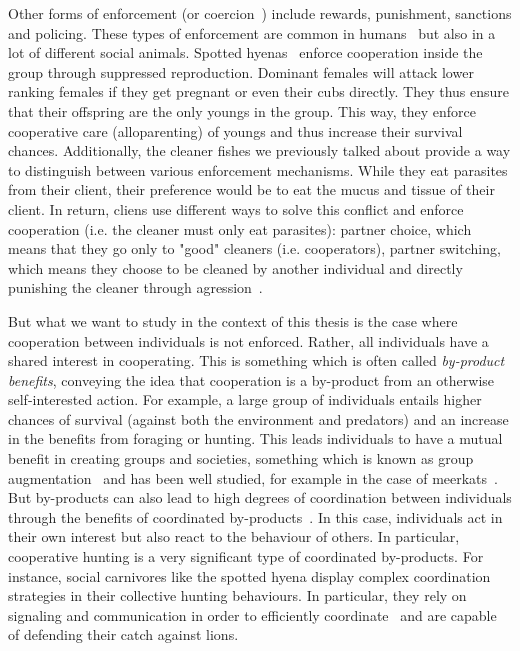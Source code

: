     Other forms of enforcement (or coercion~\parencite{Clutton-Brock2002}) include rewards, punishment, sanctions and policing. These types of enforcement are common in humans~\parencite{Fehr2002} but also in a lot of different social animals. Spotted hyenas~\parencite{Drea2003, Drea2009a, Smith2012a} enforce cooperation inside the group through suppressed reproduction. Dominant females will attack lower ranking females if they get pregnant or even their cubs directly. They thus ensure that their offspring are the only youngs in the group. This way, they enforce cooperative care (alloparenting) of youngs and thus increase their survival chances. Additionally, the cleaner fishes we previously talked about provide a way to distinguish between various enforcement mechanisms. While they eat parasites from their client, their preference would be to eat the mucus and tissue of their client. In return, cliens use different ways to solve this conflict and enforce cooperation (i.e. the cleaner must only eat parasites): partner choice, which means that they go only to "good" cleaners (i.e. cooperators), partner switching, which means they choose to be cleaned by another individual and directly punishing the cleaner through agression~\parencite{Bshary2005}.



    But what we want to study in the context of this thesis is the case where cooperation between individuals is not enforced. Rather, all individuals have a shared interest in cooperating. This is something which is often called \emph{by-product benefits}, conveying the idea that cooperation is a by-product from an otherwise self-interested action. For example, a large group of individuals entails higher chances of survival (against both the environment and predators) and an increase in the benefits from foraging or hunting. This leads individuals to have a mutual benefit in creating groups and societies, something which is known as group augmentation~\parencite{Bergmuller2007a} and has been well studied, for example in the case of meerkats~\parencite{Clutton-Brock2002}. But by-products can also lead to high degrees of coordination between individuals through the benefits of coordinated by-products~\parencite{Leimar2003}. In this case, individuals act in their own interest but also react to the behaviour of others. In particular, cooperative hunting is a very significant type of coordinated by-products. For instance, social carnivores like the spotted hyena display complex coordination strategies in their collective hunting behaviours. In particular, they rely on signaling and communication in order to efficiently coordinate~\parencite{Drea2009a, Smith2010, Smith2012a} and are capable of defending their catch against lions.

